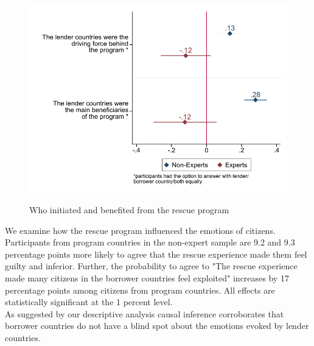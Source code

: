 \begin{figure}[h!] 
\begin{center}
     \caption{Who initiated and benefited from the rescue program}
     \includegraphics[scale=0.8]{Question3_4_base.pdf}
     \label{fig:my_label}
     \end{center}
     \tiny
\end{figure}
We examine how the rescue program influenced the emotions of citizens. Participants from program countries in the non-expert sample are 9.2 and 9.3 percentage points more likely to agree that the rescue experience made them feel guilty and inferior. Further, the probability to agree to "The rescue experience made many citizens in the borrower countries feel exploited" increases by 17 percentage points among citizens from program countries. All effects are statistically significant at the 1 percent level.  \\
As suggested by our descriptive analysis causal inference corroborates that borrower countries do not have a blind spot about the emotions evoked by lender countries.  \\


